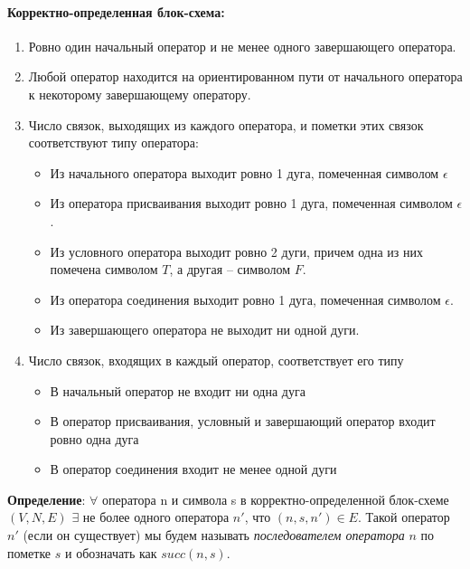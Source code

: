 \paragraph{Корректно-определенная блок-схема:}
\begin{enumerate}
    \item Ровно один начальный оператор и не менее одного завершающего оператора.
    \item Любой оператор находится на ориентированном пути от начального оператора к некоторому завершающему оператору.
    \item Число связок, выходящих из каждого оператора, и пометки этих связок соответствуют типу оператора: 
    \begin{itemize}
        \item Из начального оператора выходит ровно 1 дуга, помеченная символом $\epsilon$
        \item Из оператора присваивания выходит ровно 1 дуга, помеченная символом $\epsilon$.
        \item Из условного оператора выходит ровно 2 дуги, причем одна из них помечена символом $T$, а другая -- символом $F$.
        \item Из оператора соединения выходит ровно 1 дуга, помеченная символом $\epsilon$.
        \item Из завершающего оператора не выходит ни одной дуги.
    \end{itemize}
    \item Число связок, входящих в каждый оператор, соответствует его типу
    \begin{itemize}
        \item В начальный оператор не входит ни одна дуга
        \item В оператор присваивания, условный и завершающий оператор входит ровно одна дуга
        \item В оператор соединения входит не менее одной дуги
    \end{itemize}
\end{enumerate}

\textbf{Определение}: $\forall$ оператора n и символа s в корректно-определенной блок-схеме $(V, N, E)$ $\exists$ не более одного оператора $n'$, что $( n, s, n' ) \in E$. Такой оператор $n'$ (если он существует) мы будем называть \textit{последователем оператора} $n$ по пометке $s$ и обозначать как $succ(n, s)$.


